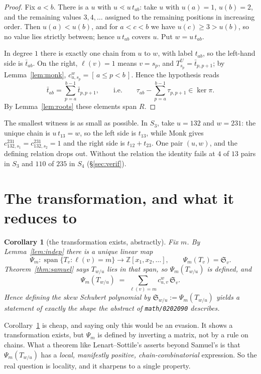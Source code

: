 \documentclass[11pt]{article}
\theoremstyle{plain}
\newtheorem{corollary}[theorem]{Corollary}
\theoremstyle{definition}
\newcommand{\Sch}{\mathfrak{S}}
\DeclareMathOperator{\len}{\ell}
\begin{document}
\begin{proof}
Fix $a<b$. There is a $u$ with $u\lessdot u\,t_{ab}$: take $u$ with $u(a)=1$,
$u(b)=2$, and the remaining values $3,4,\dots$ assigned to the remaining
positions in increasing order. Then $u(a)<u(b)$, and for $a<c<b$ we have
$u(c)\ge3>u(b)$, so no value lies strictly between; hence $u\,t_{ab}$ covers
$u$. Put $w=u\,t_{ab}$.

In degree $1$ there is exactly one chain from $u$ to $w$, with label $t_{ab}$,
so the left-hand side is $\bar{t}_{ab}$. On the right, $\len(v)=1$ means
$v=s_{p}$, and $T^{U}_{s_{p}}=\bar{t}_{p,p+1}$; by Lemma~\ref{lem:monk},
$c^{w}_{u,s_{p}}=[\,a\le p<b\,]$. Hence the hypothesis reads
\[
  \bar{t}_{ab}=\sum_{p=a}^{b-1}\bar{t}_{p,p+1},
  \qquad\text{i.e.}\qquad
  \tau_{ab}-\sum_{p=a}^{b-1}\tau_{p,p+1}\in\ker\pi .
\]
By Lemma~\ref{lem:roots} these elements span $R$.
\end{proof}

The smallest witness is as small as possible. In $S_{3}$, take $u=132$ and
$w=231$: the unique chain is $u\,t_{13}=w$, so the left side is $t_{13}$, while
Monk gives $c^{231}_{132,s_{1}}=c^{231}_{132,s_{2}}=1$ and the right side is
$t_{12}+t_{23}$. One pair $(u,w)$, and the defining relation drops out.
Without the relation the identity fails at $4$ of $13$ pairs in $S_{3}$ and
$110$ of $235$ in $S_{4}$ (\S\ref{sec:verif}).

\section{The transformation, and what it reduces to}

\begin{corollary}[the transformation exists, abstractly]\label{cor:psi}
Fix $m$. By Lemma~\ref{lem:indep} there is a unique linear map
\[
  \Psi_{m}:\operatorname{span}\{T_{v}:\len(v)=m\}\longrightarrow
  \mathbb{Z}[x_{1},x_{2},\dots],
  \qquad \Psi_{m}(T_{v})=\Sch_{v}.
\]
Theorem~\ref{thm:samuel} says $T_{w/u}$ lies in that span, so
$\Psi_{m}(T_{w/u})$ is defined, and
\[
  \Psi_{m}(T_{w/u})\;=\;\sum_{\len(v)=m}c^{w}_{u,v}\,\Sch_{v}.
\]
Hence \emph{defining} the skew Schubert polynomial by
$\Sch_{w/u}:=\Psi_{m}(T_{w/u})$ yields a statement of exactly the shape the
abstract of \texttt{math/0202090} describes.
\end{corollary}

Corollary~\ref{cor:psi} is cheap, and saying only this would be an evasion. It
shows a transformation exists, but $\Psi_{m}$ is defined by inverting a matrix,
not by a rule on chains. What a theorem like Lenart--Sottile's asserts beyond
Samuel's is that $\Psi_{m}(T_{w/u})$ has a \emph{local, manifestly positive,
chain-combinatorial} expression. So the real question is locality, and it
sharpens to a single property.
\end{document}
